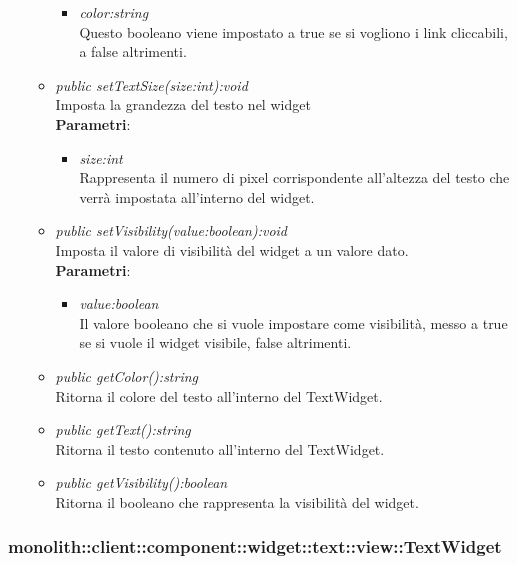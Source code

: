 \begin{itemize}
\begin{itemize}
\begin{itemize}
		\item \textit{color:string}\\
		Questo booleano viene impostato a true se si vogliono i link cliccabili, a false altrimenti.
		\end{itemize} 
	\item \textit{public setTextSize(size:int):void}\\
	Imposta la grandezza del testo nel widget
		\\ \textbf{Parametri}: \begin{itemize}
		\item \textit{size:int}\\
		Rappresenta il numero di pixel corrispondente all'altezza del testo che verrà impostata all'interno del widget.
		\end{itemize} 
				\item \textit{public setVisibility(value:boolean):void}\\
	Imposta il valore di visibilità del widget a un valore dato.
			\\ \textbf{Parametri}: \begin{itemize}
			\item \textit{value:boolean}\\
			Il valore booleano che si vuole impostare come visibilità, messo a true se si vuole il widget visibile, false altrimenti.
	\end{itemize}
	\item \textit{public getColor():string}\\
	Ritorna il colore del testo all'interno del TextWidget.
	\item \textit{public getText():string}\\
	Ritorna il testo contenuto all'interno del TextWidget.
	\item \textit{public getVisibility():boolean}\\
	Ritorna il booleano che rappresenta la visibilità del widget.
	\end{itemize}
\end{itemize}

\subsubsection{monolith::client::component::widget::text::view::TextWidget}


